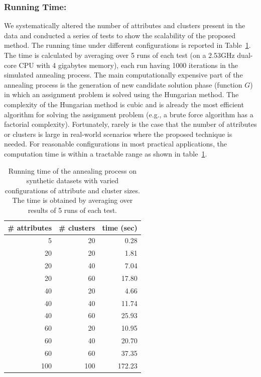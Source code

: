 \subsubsection{Running Time:}
We systematically altered the number of attributes and clusters present in the data and conducted a series of tests to show the scalability of the proposed method. The running time under different configurations is reported in Table~\ref{tbl:scale}. The time is calculated by averaging over 5 runs of each test (on a 2.53GHz dual-core CPU with 4 gigabytes memory), each run having 1000 iterations in the simulated annealing process. The main computationally expensive part of the annealing process is the generation of new candidate solution phase (function $G$) in which an assignment problem is solved using the Hungarian method. The complexity of the Hungarian method is cubic and is already the most efficient algorithm for solving the assignment problem (e.g., a brute force algorithm has a factorial complexity). Fortunately, rarely is the case that the number of attributes or clusters is large in real-world scenarios where the proposed technique is needed. For reasonable configurations in most practical applications, the computation time is within a tractable range as shown in table~\ref{tbl:scale}.
\begin{table}[tbh]
\begin{center}
\begin{tabular}{r|r|r}
\hline
\# attributes & \# clusters & time (sec)\\
\hline
5   &   20  &   0.28\\
20  &   20  &   1.81\\
20  &   40  &   7.04\\
20  &   60  &   17.80\\
40  &   20  &   4.66\\
40  &   40  &   11.74\\
40  &   60  &   25.93\\
60  &   20  &   10.95\\
60  &   40  &   20.70\\
60  &   60  &   37.35\\
100 &   100 &   172.23\\
\hline
\end{tabular}
\end{center}
\caption[Running time on the synthetic dataset]{\label{tbl:scale} Running time of the annealing process on synthetic datasets with varied configurations of attribute and cluster sizes. The time is obtained by averaging over results of 5 runs of each test.}
\end{table}

